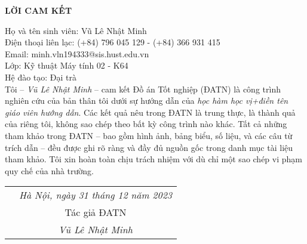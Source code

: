 \documentclass[../DoAn.tex]{subfiles}
\begin{document}
\hfill
\begin{center}
    \LARGE\textbf{LỜI CAM KẾT}\\
\end{center}
\vspace{1cm}
Họ và tên sinh viên: Vũ Lê Nhật Minh\\
Điện thoại liên lạc: (+84) 796 045 129 - (+84) 366 931 415\\ Email: minh.vln194333@sis.hust.edu.vn\\
Lớp: Kỹ thuật Máy tính 02 - K64\\
Hệ đào tạo: Đại trà\\

\vspace{1cm}
Tôi – \emph{Vũ Lê Nhật Minh} – cam kết Đồ án Tốt nghiệp (ĐATN) là công trình nghiên cứu của bản thân tôi dưới sự hướng dẫn của \emph{học hàm học vị+điền tên giáo viên hướng dẫn}. Các kết quả nêu trong ĐATN là trung thực, là thành quả của riêng tôi, không sao chép theo bất kỳ công trình nào khác. Tất cả những tham khảo trong ĐATN – bao gồm hình ảnh, bảng biểu, số liệu, và các câu từ trích dẫn – đều được ghi rõ ràng và đầy đủ nguồn gốc trong danh mục tài liệu tham khảo. Tôi xin hoàn toàn chịu trách nhiệm với dù chỉ một sao chép vi phạm quy chế của nhà trường.

\begin{table}[H]
\centering
\begin{tabular}{p{5cm} c}
\multicolumn{1}{c}{\textbf{}} &\emph{Hà Nội, ngày 31 tháng 12 năm 2023 }\vspace{0.4cm}\\
\textbf{}               & Tác giả ĐATN \vspace{3cm} \\

\textbf{}               & \emph{Vũ Lê Nhật Minh}
\end{tabular}
\end{table}
\end{document}
